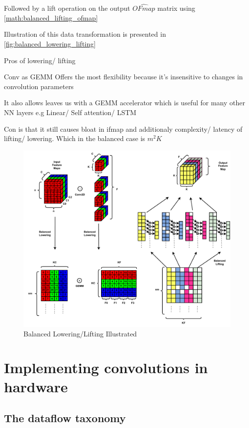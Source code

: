 Followed by a lift operation on the output $\hat{OFmap}$ matrix using \eqref{math:balanced_lifting_ofmap}

Illustration of this data transformation is presented in \autoref{fig:balanced_lowering_lifting}

Pros of lowering/ lifting

Conv as GEMM Offers the most flexibility because it’s insensitive to changes in
convolution parameters

It also allows leaves us with a GEMM accelerator which is useful for many other
NN layers e.g Linear/ Self attention/ LSTM

Con is that it still causes bloat in ifmap and additionaly complexity/ latency of 
lifting/ lowering. Which in the balanced case is $m^{2}K$ \cite{cafe_con_troll}

\begin{figure}[!ht]
    \centering
    \includegraphics[scale=0.6]{fig/BalancedLoweringLifting.pdf}
    \caption{Balanced Lowering/Lifting Illustrated}
    \label{fig:balanced_lowering_lifting}
\end{figure}


\section{Implementing convolutions in hardware}
\subsection{The dataflow taxonomy}

